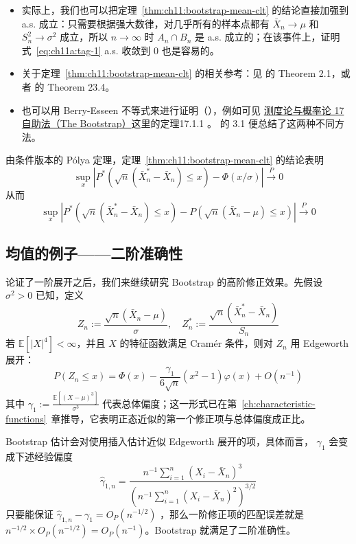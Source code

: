 \begin{remark}

\begin{itemize}
\tightlist
\item
  实际上，我们也可以把定理~\ref{thm:ch11:bootstrap-mean-clt} 的结论直接加强到 a.s. 成立：只需要根据强大数律，对几乎所有的样本点都有 $\bar X_n\to\mu$ 和 $S_n^2\to\sigma^2$ 成立，所以 $n\to\infty$ 时 $A_n\cap B_n$ 是 a.s. 成立的；在该事件上，证明式~\eqref{eq:ch11a:tag-1} a.s. 收敛到 0 也是容易的。
\item
  关于定理~\ref{thm:ch11:bootstrap-mean-clt} 的相关参考：见 \cite{bickelfreedman1981} 的 Theorem 2.1，或者 \cite{vandervaart1998} 的 Theorem 23.4。
\item
  也可以用 Berry-Esseen 不等式来进行证明（\cite{singh1981}），例如可见 \href{https://zhuanlan.zhihu.com/p/2018774323612133216}{测度论与概率论 \textbar{} 17 自助法（The Bootstrap）}这里的定理17.1.1 。\cite{shaotu1996} 的 3.1 便总结了这两种不同方法。
\end{itemize}

\end{remark}

\begin{corollary}\label{cor:ch11:bootstrap-mean-uniform}
由条件版本的 Pólya 定理，定理~\ref{thm:ch11:bootstrap-mean-clt} 的结论表明
\[\sup_x \left| P^*\!\left(\sqrt{n}(\bar{X}_n^*-\bar{X}_n)\leq x\right) -\Phi(x/\sigma) \right| \overset{P}\to 0\]
从而
\[\sup_x \left| P^*\!\left(\sqrt{n}(\bar{X}_n^*-\bar{X}_n)\leq x\right) - P\!\left(\sqrt{n}(\bar{X}_n-\mu)\leq x\right) \right| \overset{P}\to 0\]\end{corollary}

\subsection{均值的例子------二阶准确性}

论证了一阶展开之后，我们来继续研究 Bootstrap 的高阶修正效果。先假设 $\sigma^2>0$ 已知，定义
\[Z_n:=\frac{\sqrt{n}(\bar{X}_n-\mu)}{\sigma},\quad Z_n^*:=\frac{\sqrt n(\bar X_n^*-\bar X_n)}{S_n}\]
若 $\mathbb{E}[|X|^4]<\infty$，并且 $X$ 的特征函数满足 Cramér 条件，则对 $Z_n$ 用 Edgeworth 展开：
\[P(Z_n\leq x) = \Phi(x) -\frac{\gamma_1}{6\sqrt{n}}(x^2-1)\varphi(x) +O(n^{-1})\]
其中 $\gamma_1:=\frac{\mathbb{E}[(X-\mu)^3]}{\sigma^3}$ 代表总体偏度；这一形式已在第~\ref{ch:characteristic-functions}~章推导，它表明正态近似的第一个修正项与总体偏度成正比。

Bootstrap 估计会对使用插入估计近似 Edgeworth 展开的项，具体而言， $\gamma_1$ 会变成下述经验偏度
\[\widehat{\gamma}_{1,n}=\frac{n^{-1}\sum_{i=1}^n(X_i-\bar{X}_n)^3}{\left(n^{-1}\sum_{i=1}^n(X_i-\bar{X}_n)^2\right)^{3/2}}\]
只要能保证 $\widehat\gamma_{1,n}-\gamma_1=O_P(n^{-1/2})$ ，那么一阶修正项的匹配误差就是 $n^{-1/2}\times O_{P}(n^{-1/2})=O_{P}(n^{-1})$。Bootstrap 就满足了二阶准确性。

